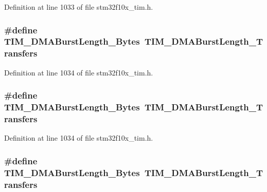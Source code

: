 Definition at line 1033 of file stm32f10x\+\_\+tim.\+h.

\subsubsection[{\texorpdfstring{T\+I\+M\+\_\+\+D\+M\+A\+Burst\+Length\+\_\+15\+Bytes}{TIM_DMABurstLength_15Bytes}}]{\setlength{\rightskip}{0pt plus 5cm}\#define T\+I\+M\+\_\+\+D\+M\+A\+Burst\+Length\+\_\+Bytes~{\bf T\+I\+M\+\_\+\+D\+M\+A\+Burst\+Length\+\_\+Transfers}}\hypertarget{group___t_i_m___legacy_ga3ca90d9fa3c80590175ba42baac57098}{}\label{group___t_i_m___legacy_ga3ca90d9fa3c80590175ba42baac57098}


Definition at line 1034 of file stm32f10x\+\_\+tim.\+h.

\subsubsection[{\texorpdfstring{T\+I\+M\+\_\+\+D\+M\+A\+Burst\+Length\+\_\+15\+Bytes}{TIM_DMABurstLength_15Bytes}}]{\setlength{\rightskip}{0pt plus 5cm}\#define T\+I\+M\+\_\+\+D\+M\+A\+Burst\+Length\+\_\+Bytes~{\bf T\+I\+M\+\_\+\+D\+M\+A\+Burst\+Length\+\_\+Transfers}}\hypertarget{group___t_i_m___legacy_ga3ca90d9fa3c80590175ba42baac57098}{}\label{group___t_i_m___legacy_ga3ca90d9fa3c80590175ba42baac57098}


Definition at line 1034 of file stm32f10x\+\_\+tim.\+h.

\subsubsection[{\texorpdfstring{T\+I\+M\+\_\+\+D\+M\+A\+Burst\+Length\+\_\+16\+Bytes}{TIM_DMABurstLength_16Bytes}}]{\setlength{\rightskip}{0pt plus 5cm}\#define T\+I\+M\+\_\+\+D\+M\+A\+Burst\+Length\+\_\+Bytes~{\bf T\+I\+M\+\_\+\+D\+M\+A\+Burst\+Length\+\_\+Transfers}}\hypertarget{group___t_i_m___legacy_ga672117a7dafcd778fe8e86db423b07e9}{}\label{group___t_i_m___legacy_ga672117a7dafcd778fe8e86db423b07e9}


